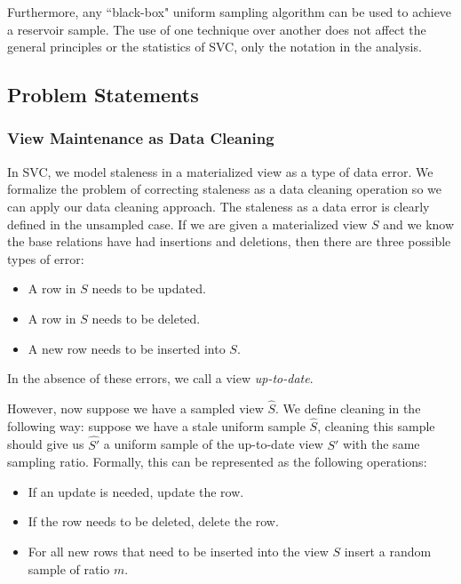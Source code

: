 Furthermore, any ``black-box" uniform sampling algorithm can be used to achieve a reservoir sample.
The use of one technique over another does not affect the general principles or the statistics of SVC, only the 
notation in the analysis.
\fi

\subsection{Problem Statements}
\subsubsection{View Maintenance as Data Cleaning}\label{cleaning}
In SVC, we model staleness in a materialized view as a type of data error.
We formalize the problem of correcting staleness as a data cleaning operation so we can apply our data cleaning approach.
The staleness as a data error is clearly defined in the unsampled case.
If we are given a materialized view $S$ and we know the base relations have had insertions and deletions, then there are three possible types of error:
\begin{itemize}[noitemsep]
\item A row in $S$ needs to be updated.
\item A row in $S$ needs to be deleted.
\item A new row needs to be inserted into $S$.
\end{itemize}
In the absence of these errors, we call a view \emph{up-to-date}.

However, now suppose we have a sampled view $\hat{S}$.
We define cleaning in the following way: suppose we have a stale uniform sample $\hat{S}$, cleaning this sample
should give us $\hat{S'}$ a uniform sample of the up-to-date view $S'$ with the same sampling ratio.
Formally, this can be represented as the following operations:
\begin{itemize}[noitemsep]
\item If an update is needed, update the row.
\item If the row needs to be deleted, delete the row.
\item For all new rows that need to be inserted into the view $S$ insert a random sample of ratio $m$.
\end{itemize}

